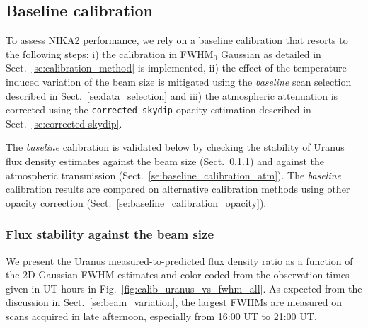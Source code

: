 

\subsection{Baseline calibration}
\label{se:baseline_calibration}

To assess NIKA2 performance, we rely on a baseline calibration that
resorts to the following steps: i) the calibration in FWHM$_0$ Gaussian
as detailed in Sect.~\ref{se:calibration_method} is implemented, ii)
the effect of the temperature-induced variation of the beam size is
mitigated using the \emph{baseline} scan selection described in
Sect.~\ref{se:data_selection} and iii) the
atmospheric attenuation is corrected using the {\tt corrected skydip}
opacity estimation described in Sect.~\ref{se:corrected-skydip}.

The \emph{baseline} calibration is validated below by checking the
stability of Uranus flux density estimates against the beam size
(Sect.~\ref{se:baseline_calibration_scans}) and against the
atmospheric transmission
(Sect.~\ref{se:baseline_calibration_atm}). The \emph{baseline}
calibration results are compared on alternative calibration methods
using other opacity correction (Sect.~\ref{se:baseline_calibration_opacity}).


\subsubsection{Flux stability against the beam size}
\label{se:baseline_calibration_scans}

We present the Uranus measured-to-predicted flux density ratio as a
function of the 2D Gaussian FWHM estimates and color-coded from the
observation times given in UT hours in
Fig.~\ref{fig:calib_uranus_vs_fwhm_all}. {\lp As expected from the
discussion in Sect.~\ref{se:beam_variation}, the largest FWHMs are
measured on scans acquired in late afternoon, especially from 16:00 UT
to 21:00 UT.}  


